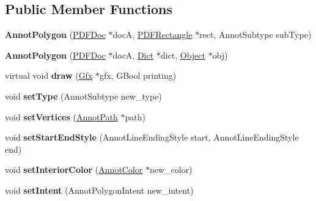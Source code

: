 \subsection*{Public Member Functions}
\begin{DoxyCompactItemize}
\item 
\mbox{\label{class_annot_polygon_ab5d4b647129ee5d3703c684c1546ae6c}} 
{\bfseries Annot\+Polygon} (\hyperlink{class_p_d_f_doc}{P\+D\+F\+Doc} $\ast$docA, \hyperlink{class_p_d_f_rectangle}{P\+D\+F\+Rectangle} $\ast$rect, Annot\+Subtype sub\+Type)
\item 
\mbox{\label{class_annot_polygon_a916760b9fe4c452842a95843af8e6891}} 
{\bfseries Annot\+Polygon} (\hyperlink{class_p_d_f_doc}{P\+D\+F\+Doc} $\ast$docA, \hyperlink{class_dict}{Dict} $\ast$dict, \hyperlink{class_object}{Object} $\ast$obj)
\item 
\mbox{\label{class_annot_polygon_af075ebba1dd37a5e3f43b4b59d6c2478}} 
virtual void {\bfseries draw} (\hyperlink{class_gfx}{Gfx} $\ast$gfx, G\+Bool printing)
\item 
\mbox{\label{class_annot_polygon_a0dab74f61ff40c745e1ebfea11df87e3}} 
void {\bfseries set\+Type} (Annot\+Subtype new\+\_\+type)
\item 
\mbox{\label{class_annot_polygon_aa472bddbe9de477727dd710bc020b6cb}} 
void {\bfseries set\+Vertices} (\hyperlink{class_annot_path}{Annot\+Path} $\ast$path)
\item 
\mbox{\label{class_annot_polygon_a509cda30e6b7658b1394134be9f0eacc}} 
void {\bfseries set\+Start\+End\+Style} (Annot\+Line\+Ending\+Style start, Annot\+Line\+Ending\+Style end)
\item 
\mbox{\label{class_annot_polygon_ad2f7b225fc1a7f9117bf996af812a5a4}} 
void {\bfseries set\+Interior\+Color} (\hyperlink{class_annot_color}{Annot\+Color} $\ast$new\+\_\+color)
\item 
\mbox{\label{class_annot_polygon_a1ab83c35b4c1e3ad0a33d7872f2195b1}} 
void {\bfseries set\+Intent} (Annot\+Polygon\+Intent new\+\_\+intent)
\item 

\end{DoxyCompactItemize}
